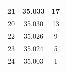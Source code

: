 \documentclass{article}
\theoremstyle{mytheoremstyle}
\theoremstyle{mytheoremstyle}
\theoremstyle{myproblemstyle}
\begin{document}
\begin{tabular}{|c|c|c|}
	21               & 35.033                                                                            & 17                                                                                    \\ \hline
	20               & 35.030                                                                            & 13                                                                                    \\ \hline
	22               & 35.026                                                                            & 9                                                                                     \\ \hline
	23               & 35.024                                                                            & 5                                                                                     \\ \hline
	24               & 35.003                                                                            & 1                                                                                     \\ \hline
	\end{tabular}
\end{document}
